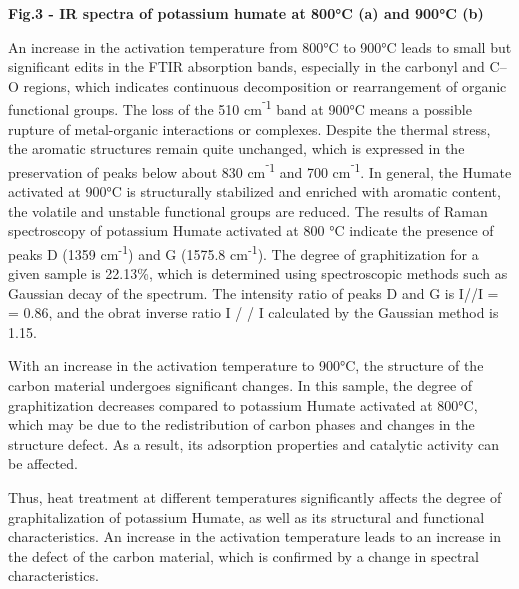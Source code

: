 
{\bfseries Fig.3 - IR spectra of potassium humate at 800°C (a) and 900°C
(b)}

An increase in the activation temperature from 800°C to 900°C leads to
small but significant edits in the FTIR absorption bands, especially in
the carbonyl and C--O regions, which indicates continuous decomposition
or rearrangement of organic functional groups. The loss of the 510
cm\textsuperscript{⁻1} band at 900°C means a possible rupture of
metal-organic interactions or complexes. Despite the thermal stress, the
aromatic structures remain quite unchanged, which is expressed in the
preservation of peaks below about 830 cm\textsuperscript{⁻1} and 700
cm\textsuperscript{⁻1}. In general, the Humate activated at 900°C is
structurally stabilized and enriched with aromatic content, the volatile
and unstable functional groups are reduced. The results of Raman
spectroscopy of potassium Humate activated at 800 °C indicate the
presence of peaks D (1359 cm\textsuperscript{-1}) and G (1575.8
cm\textsuperscript{-1}). The degree of graphitization for a given sample
is 22.13\%, which is determined using spectroscopic methods such as
Gaussian decay of the spectrum. The intensity ratio of peaks D and G is
I//I = = 0.86, and the obrat inverse ratio I / / I calculated by the
Gaussian method is 1.15.

With an increase in the activation temperature to 900°C, the structure
of the carbon material undergoes significant changes. In this sample,
the degree of graphitization decreases compared to potassium Humate
activated at 800°C, which may be due to the redistribution of carbon
phases and changes in the structure defect. As a result, its adsorption
properties and catalytic activity can be affected.

Thus, heat treatment at different temperatures significantly affects the
degree of graphitalization of potassium Humate, as well as its
structural and functional characteristics. An increase in the activation
temperature leads to an increase in the defect of the carbon material,
which is confirmed by a change in spectral characteristics.

